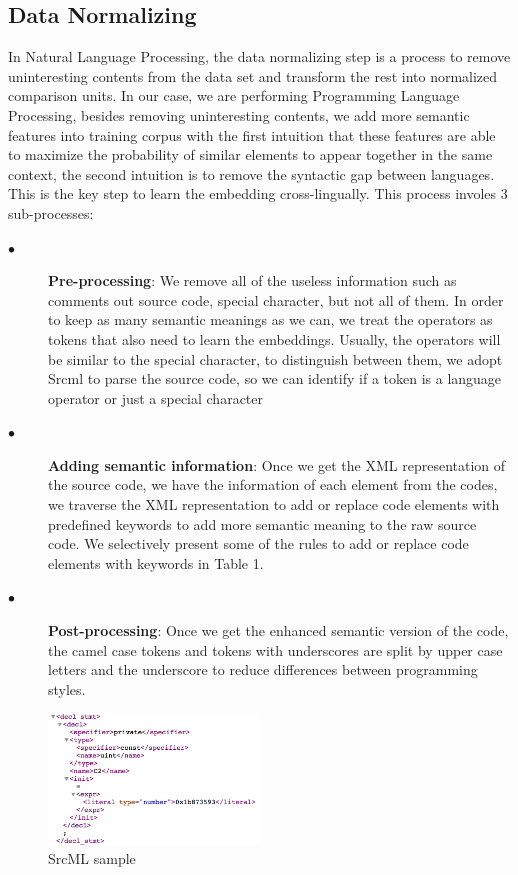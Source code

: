 \subsection{Data Normalizing}

In Natural Language Processing, the data normalizing step is a process to remove uninteresting contents from the data set and transform the rest into normalized comparison units. In our case, we are performing Programming Language Processing, besides removing uninteresting contents, we add more semantic features into training corpus with the first intuition that these features are able to maximize the probability of similar elements to appear together in the same context, the second intuition is to remove the syntactic gap between languages. This is the key step to learn the embedding cross-lingually. This process involes 3 sub-processes:

\begin{description}
	\item [$\bullet$] \textbf{Pre-processing}: We remove all of the useless information such as comments out source code, special character, but not all of them. In order to keep as many semantic meanings as we can, we treat the operators as tokens that also need to learn the embeddings. Usually, the operators will be similar to the special character, to distinguish between them, we adopt Srcml \cite{collard2011lightweight} to parse the source code, so we can identify if a token is a language operator or just a special character
	\item [$\bullet$] \textbf{Adding semantic information}: Once we get the XML representation of the source code, we have the information of each element from the codes, we traverse the XML representation to add or replace code elements with predefined keywords to add more semantic meaning to the raw source code. We selectively present some of the rules to add or replace code elements with keywords in Table 1.
	\item [$\bullet$] \textbf{Post-processing}: Once we get the enhanced semantic version of the code, the camel case tokens and tokens with underscores are split by upper case letters and the underscore to reduce differences between programming styles.
\end{description}

\begin{figure}[t!]
	
	\includegraphics[width=0.50\textwidth]{srcml_sample}
	\caption{SrcML sample}
	\label{fig:clf}
\end{figure}

